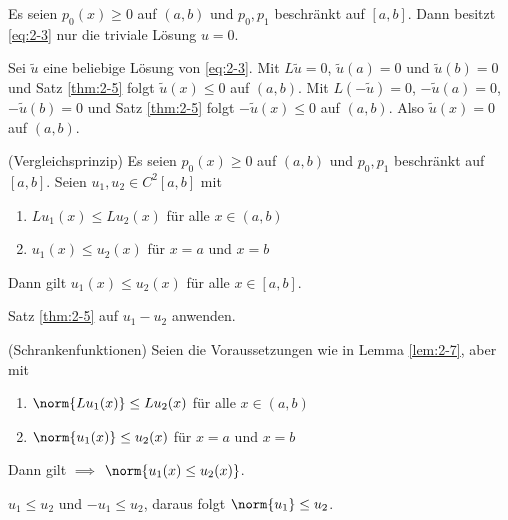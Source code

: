 \begin{lemma}\label{lem:2-6}
  Es seien $p_{0}(x) \geq 0$ auf $(a, b)$ und $p_{0}, p_{1}$ beschränkt auf $[a, b]$. Dann besitzt \eqref{eq:2-3} nur die triviale Lösung $u = 0$. 
\end{lemma}
\begin{beweis}
  Sei $\tilde u$ eine beliebige Lösung von \eqref{eq:2-3}. Mit $L \tilde u = 0$, $\tilde u (a) = 0$ und $\tilde u (b) = 0$  und Satz \ref{thm:2-5} folgt $\tilde u (x)\leq 0$ auf $(a, b)$. Mit $L(- \tilde u) = 0$, $-\tilde u(a) = 0$, $-\tilde u(b) = 0$ und Satz \ref{thm:2-5} folgt $-\tilde u(x) \leq 0$ auf $(a, b)$. 
Also $\tilde u(x) = 0$ auf $(a, b)$. 
\end{beweis}
\begin{lemma}\label{lem:2-7}(Vergleichsprinzip)
  Es seien $p_{0}(x) \geq 0$ auf $(a, b)$ und $p_{0}, p_{1}$ beschränkt auf $[a, b]$. Seien $u_{1}, u_{2} \in C^{2}[a, b]$ mit
  \begin{enumerate}
  \item $Lu_{1}(x) \leq Lu_{2}(x)$ für alle $x \in (a, b)$
  \item $u_{1}(x)\leq u_{2}(x)$ für $x = a$ und $x = b$
  \end{enumerate}
Dann gilt $u_{1}(x)\leq u_{2}(x)$ für alle $x \in [a, b]$. 
\end{lemma}
\begin{beweis}
  Satz \ref{thm:2-5} auf $u_{1} - u_{2}$ anwenden. 
\end{beweis}
\begin{lemma}\label{lem:2-8} (Schrankenfunktionen)
  Seien die Voraussetzungen wie in Lemma \ref{lem:2-7}, aber mit
  \begin{enumerate}
  \item $\norm{Lu_{1}(x)} \leq Lu_{2}(x)$ für alle $x \in (a, b)$ 
  \item $\norm{u_{1}(x)}\leq u_{2}(x)$ für $x = a$ und $x = b$
  \end{enumerate}
Dann gilt $\implies$ $\norm{u_{1}(x)\leq u_{2}(x)}$. 
\end{lemma}
\begin{beweis}
  $u_{1}\leq u_{2}$ und $-u_{1} \leq u_{2}$, daraus folgt $\norm{u_{1}}\leq u_{2}$. 
\end{beweis}
